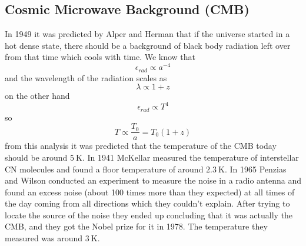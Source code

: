 \subsection{Cosmic Microwave Background (CMB)}
In 1949 it was predicted by Alper and Herman that if the universe started in a hot dense state, there should be a background of black body radiation left over from that time which cools with time. We know that
\begin{equation}
    \epsilon_{rad} \propto a^{-4}
\end{equation}
and the wavelength of the radiation scales as
\begin{equation}
    \lambda \propto 1+z
\end{equation}
on the other hand
\begin{equation}
    \epsilon_{rad} \propto T^4
\end{equation}
so
\begin{equation}
    T \propto \frac{T_0}{a} = T_0 (1 + z)
\end{equation}
from this analysis it was predicted that the temperature of the CMB today should be around \(\qty{5}{\kelvin}\). In 1941 McKellar measured the temperature of interstellar CN molecules and found a floor temperature of around \(\qty{2.3}{\kelvin}\). In 1965 Penzias and Wilson conducted an experiment to measure the noise in a radio antenna and found an excess noise (about 100 times more than they expected) at all times of the day coming from all directions which they couldn't explain. After trying to locate the source of the noise they ended up concluding that it was actually the CMB, and they got the Nobel prize for it in 1978. The temperature they measured was around \(\qty{3}{\kelvin}\).
